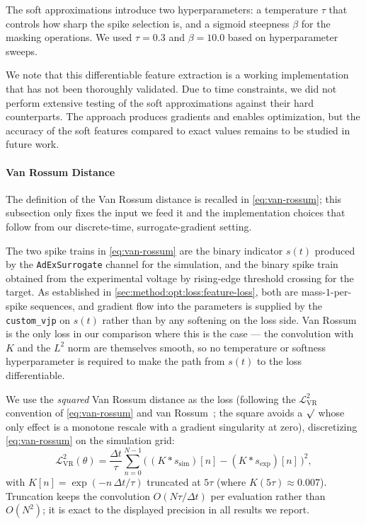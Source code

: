 The soft approximations introduce two hyperparameters: a temperature $\tau$ that controls how sharp the spike selection is, and a sigmoid steepness $\beta$ for the masking operations.
We used $\tau = 0.3$ and $\beta = 10.0$ based on hyperparameter sweeps.

We note that this differentiable feature extraction is a working implementation that has not been thoroughly validated.
Due to time constraints, we did not perform extensive testing of the soft approximations against their hard counterparts.
The approach produces gradients and enables optimization, but the accuracy of the soft features compared to exact values remains to be studied in future work.

\paragraph{Van Rossum Distance}\label{sec:method:opt:loss:van-rossum}
The definition of the Van Rossum distance is recalled in \cref{eq:van-rossum};
this subsection only fixes the input we feed it and the implementation choices that follow from our discrete-time, surrogate-gradient setting.

The two spike trains in \cref{eq:van-rossum} are the binary indicator $s(t)$ produced by the \texttt{AdExSurrogate} channel for the simulation, and the binary spike train obtained from the experimental voltage by rising-edge threshold crossing for the target.
As established in \cref{sec:method:opt:loss:feature-loss}, both are mass-$1$-per-spike sequences, and gradient flow into the parameters is supplied by the \texttt{custom\_vjp} on $s(t)$ rather than by any softening on the loss side.
Van Rossum is the only loss in our comparison where this is the case --- the convolution with $K$ and the $L^2$ norm are themselves smooth, so no temperature or softness hyperparameter is required to make the path from $s(t)$ to the loss differentiable.

We use the \emph{squared} Van Rossum distance as the loss (following the $\mathcal{L}_{\mathrm{VR}}^{2}$ convention of \cref{eq:van-rossum} and van Rossum~\cite{Rossum2001}; the square avoids a $\surd$ whose only effect is a monotone rescale with a gradient singularity at zero), discretizing \cref{eq:van-rossum} on the simulation grid:
\begin{equation}\label{eq:vr-discrete}
    \mathcal{L}_{\mathrm{VR}}^{2}(\theta) = \frac{\Delta t}{\tau} \sum_{n=0}^{N-1} \bigl(\,(K * s_{\mathrm{sim}})[n] - (K * s_{\mathrm{exp}})[n]\,\bigr)^{2},
\end{equation}
with $K[n] = \exp(-n\,\Delta t / \tau)$ truncated at $5\tau$ (where $K(5\tau) \approx 0.007$).
Truncation keeps the convolution $O(N\tau/\Delta t)$ per evaluation rather than $O(N^{2})$; it is exact to the displayed precision in all results we report.

